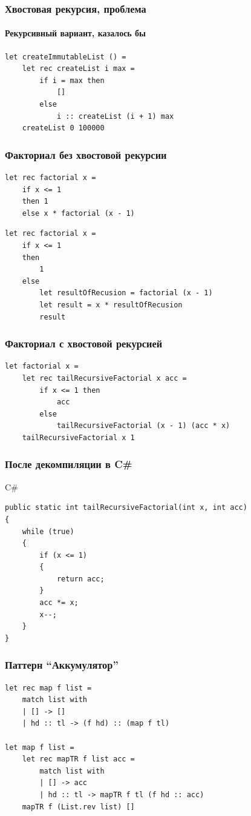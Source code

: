 \documentclass[xetex,mathserif,serif]{beamer}
\begin{document}
	\begin{frame}[fragile]
		\frametitle{Хвостовая рекурсия, проблема}
		\framesubtitle{Рекурсивный вариант, казалось бы}
		\begin{verbatim}
let createImmutableList () =
    let rec createList i max =
        if i = max then
            []
        else
            i :: createList (i + 1) max
    createList 0 100000
		\end{verbatim}
	\end{frame}

	\begin{frame}[fragile]
		\frametitle{Факториал без хвостовой рекурсии}
		\begin{verbatim}
let rec factorial x =
    if x <= 1
    then 1 
    else x * factorial (x - 1)
		\end{verbatim}

		\begin{verbatim}
let rec factorial x =
    if x <= 1
    then
        1
    else
        let resultOfRecusion = factorial (x - 1)
        let result = x * resultOfRecusion
        result
		\end{verbatim}
	\end{frame}

	\begin{frame}[fragile]
		\frametitle{Факториал с хвостовой рекурсией}
		\begin{verbatim}
let factorial x =
    let rec tailRecursiveFactorial x acc =
        if x <= 1 then
            acc
        else
            tailRecursiveFactorial (x - 1) (acc * x)
    tailRecursiveFactorial x 1
		\end{verbatim}
	\end{frame}
	
	\begin{frame}[fragile]
		\frametitle{После декомпиляции в C\#}
		\begin{alertblock}{C\#}
			\begin{verbatim}
public static int tailRecursiveFactorial(int x, int acc)
{
    while (true)
    {
        if (x <= 1)
        {
            return acc;
        }
        acc *= x;
        x--;
    }
}
			\end{verbatim}
		\end{alertblock}
	\end{frame}

	\begin{frame}[fragile]
		\frametitle{Паттерн ``Аккумулятор''}
		\begin{verbatim}
let rec map f list =
    match list with
    | [] -> []
    | hd :: tl -> (f hd) :: (map f tl)

let map f list =
    let rec mapTR f list acc =
        match list with
        | [] -> acc
        | hd :: tl -> mapTR f tl (f hd :: acc)
    mapTR f (List.rev list) []
		\end{verbatim}
	\end{frame}
\end{document}
